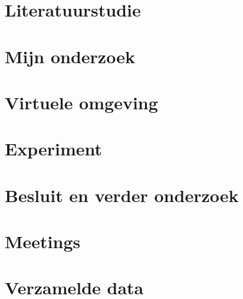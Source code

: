 \documentclass[a4paper,12pt]{report}
\begin{document}
\tableofcontents


\chapter{Literatuurstudie}


\chapter{Mijn onderzoek}


\chapter{Virtuele omgeving}


\chapter{Experiment}


\chapter{Besluit en verder onderzoek}



\appendix

\chapter{Meetings}


\chapter{Verzamelde data}



\newpage


\end{document}
